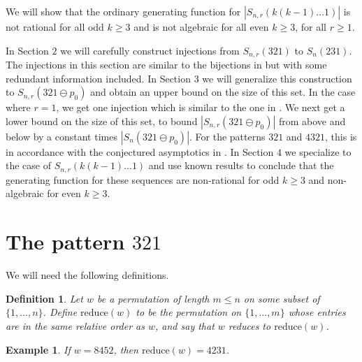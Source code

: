 \documentclass[11pt]{amsart}
\newtheorem{definition}[theorem]{Definition}
\newtheorem{example}[theorem]{Example}
\theoremstyle{remark}
\numberwithin{equation}{section}
\begin{document}

We will show that the ordinary generating function for $|S_{n,r}(k(k-1)...1)|$ is not rational for all odd $k\geq 3$ and is not algebraic for all even $k\geq 3$, for all $r \geq 1$.

In Section $2$ we will carefully construct injections from $S_{n,r}(321)$ to $S_{n}(231)$. The injections in this section are similar to the bijections in \cite{Callan} but with some redundant information included. In Section $3$ we will generalize this construction to $S_{n,r}(321 \ominus p_0)$ and obtain an upper bound on the size of this set. In the case where $r=1$, we get one injection which is similar to the one in \cite{Bona}. We next get a lower bound on the size of this set, to bound $|S_{n,r}(321 \ominus p_0)|$ from above and below by a constant times $|S_{n}(321 \ominus p_0)|$. For the patterns $321$ and $4321$, this is in accordance with the conjectured asymptotics in \cite{Conway}. In Section $4$ we specialize to the case of $S_{n,r}(k(k-1)...1)$ and use known results to conclude that the generating function for these sequences are non-rational for odd $k\geq 3$ and non-algebraic for even $k\geq 3$.


\section{The pattern $321$}
We will need the following definitions.

\begin{definition}
    Let $w$ be a permutation of length $m \leq n$ on some subset of $\{ 1, ..., n\}$. Define $\text{reduce}(w)$ to be the permutation on $\{1,...,m\}$ whose entries are in the same relative order as $w$, and say that $w$ reduces to $\text{reduce}(w)$.
\end{definition}

\begin{example}
    If $w = 8452$, then $\text{reduce}(w) = 4231$.
\end{example}
\end{document}

